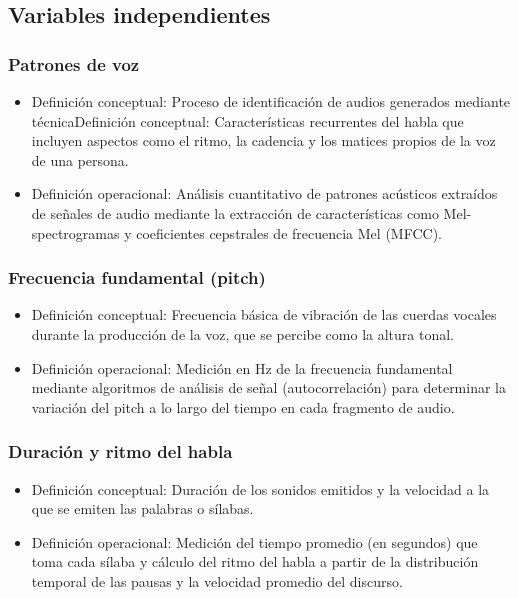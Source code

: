 \subsection{Variables independientes}

\subsubsection{Patrones de voz}

\begin{itemize}
	\item Definición conceptual: Proceso de identificación de audios generados mediante técnicaDefinición conceptual: Características recurrentes del habla que incluyen aspectos como el ritmo, la cadencia y los matices propios de la voz de una persona.
	\item Definición operacional: Análisis cuantitativo de patrones acústicos extraídos de señales de audio mediante la extracción de características como Mel-spectrogramas y coeficientes cepstrales de frecuencia Mel (MFCC).
\end{itemize}

\subsubsection{Frecuencia fundamental (pitch)}

\begin{itemize}
	\item Definición conceptual: Frecuencia básica de vibración de las cuerdas vocales durante la producción de la voz, que se percibe como la altura tonal.
	\item Definición operacional: Medición en Hz de la frecuencia fundamental mediante algoritmos de análisis de señal (autocorrelación) para determinar la variación del pitch a lo largo del tiempo en cada fragmento de audio.
\end{itemize}

\subsubsection{Duración y ritmo del habla}

\begin{itemize}
	\item Definición conceptual: Duración de los sonidos emitidos y la velocidad a la que se emiten las palabras o sílabas.
	\item Definición operacional: Medición del tiempo promedio (en segundos) que toma cada sílaba y cálculo del ritmo del habla a partir de la distribución temporal de las pausas y la velocidad promedio del discurso.
\end{itemize}

